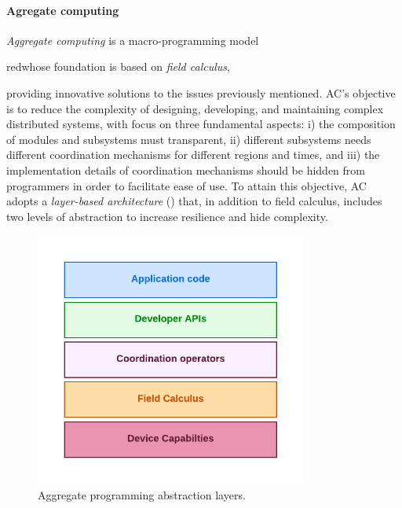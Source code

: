 \documentclass[12pt,a4paper,openright,twoside]{book}
\begin{document}
\paragraph{Agregate computing}
\emph{Aggregate computing} \cite{AC} is a macro-programming model \begin{color}{red}whose foundation is based on \emph{field calculus}, \end{color}providing innovative solutions
    to the issues previously mentioned. AC's objective is to reduce the complexity of designing, developing, 
    and maintaining complex distributed systems, with focus on three fundamental aspects:
    i) the composition of modules and subsystems must transparent,
    ii) different subsystems needs different coordination mechanisms for different regions and times, and 
    iii) the implementation details of coordination mechanisms should be hidden from programmers in order to facilitate ease of use.
    To attain this objective, AC adopts a \emph{layer-based architecture} () that, in addition to field calculus, 
    includes two levels of abstraction to increase resilience and hide complexity. 


\begin{figure}[t]
    \centering
    \includegraphics[width=0.8\textwidth]{figures/AC-layers.pdf}
    \caption{Aggregate programming abstraction layers.}
    \label{fig:ac-layers}
\end{figure}
\end{document}
